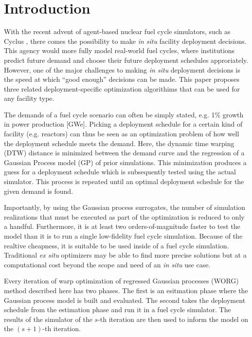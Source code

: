 \section{Introduction}
\label{intro}

With the recent advent of agent-based nuclear fuel cycle simulators, such as 
Cyclus \cite{DBLP:journals/corr/HuffGCFMOSSW15,cyclus_v1_0}, there comes the 
possibility to make \emph{in situ} facility deployment decisions. This 
agency would more fully model real-world fuel cycles, where institutions
predict future demand and choose their future deployment schedules 
approriately. However, one of the major challenges to making \emph{in situ}
deployment decisions is the speed at which ``good enough'' decisions can 
be made. This paper proposes three related deployment-specific optimization 
algorithims that can be used for any facility type.

The demands of a fuel cycle scenario can often be simply stated, e.g. 
1\% growth in power production [GWe]. Picking a deployment schedule for a 
certain kind of facility (e.g. reactors) can thus be seen as an optimization 
problem of how well the deployment schedule meets the demand. Here, the 
dynamic time warping (DTW) \cite{muller} distance is minimized 
between the demand curve and the regression of a Gaussian Process model (GP) 
\cite{rasmussen2006gaussian} of prior simulations. This minimization produces
a guess for a deployment schedule which is subsequently tested using 
the actual simulator. This process is repeated until an optimal deployment
schedule for the given demand is found.

Importantly, by using the Gaussian process surrogates, the number of 
simulation realizations that must be executed as part of the optimization is 
reduced to only a handful. Furthermore, it is at least two 
orders-of-magnitude faster to test the model than it is to run a single
low-fidelity fuel cycle simulation. Because of the realtive cheapness, it 
is suitable to be used inside of a fuel cycle simulation. Traditional
\emph{ex situ} optimizers may be able to find more precise solutions but at a
computational cost beyond the scope and need of an \emph{in situ} use case.

Every iteration of warp optimization of regressed Gaussian processes (WORG) 
method described here has two phases. The first is an esitmation phase where 
the Gaussian process model is built and evaluated. The second takes the 
deployment schedule from the estimation phase and run it in a fuel cycle 
simulator. The results of the simulator of the $s$-th iteration are then 
used to inform the model on the $(s+1)$-th iteration. 


